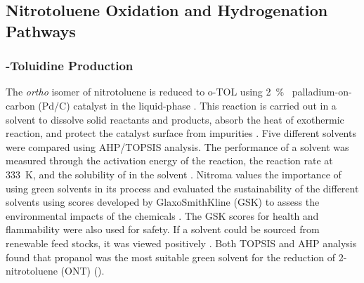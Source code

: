 

\subsection{Nitrotoluene Oxidation and Hydrogenation Pathways}
\subsubsection{\ortho-Toluidine Production}
The \textit{ortho} isomer of nitrotoluene is reduced to o-TOL using \SI{2}{\percent\ww} palladium-on-carbon (Pd/C) catalyst in the liquid-phase \cite{rajadhyaksha_solvent_1986}. This reaction is carried out in a solvent to dissolve solid reactants and products, absorb the heat of exothermic reaction, and protect the catalyst surface from impurities \cite{yao_kinetics_1959}. Five different solvents were compared using AHP/TOPSIS analysis. The performance of a solvent was measured through the activation energy of the reaction, the reaction rate at \SI{333}{\K}, and the solubility of  in the solvent \cite{rajadhyaksha_solvent_1986}. Nitroma values the importance of using green solvents in its process and evaluated the sustainability of the different solvents using scores developed by GlaxoSmithKline (GSK) to assess the environmental impacts of the chemicals \cite{henderson_expanding_2011}. The GSK scores for health and flammability were also used for safety. If a solvent could be sourced from renewable feed stocks, it was viewed positively \cite{byrne_tools_2016}. Both TOPSIS and AHP analysis found that propanol was the most suitable green solvent for the reduction of 2-nitrotoluene (ONT) ().



